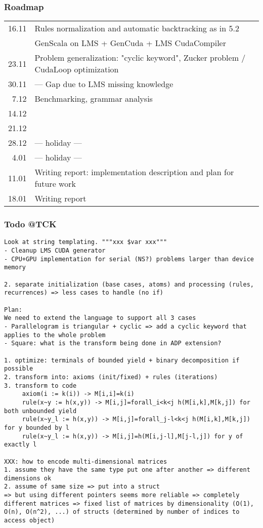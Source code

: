 \documentclass[11pt]{article}
\begin{document}
\subsubsection*{Roadmap}
\begin{tabular}{rl}
16.11 & Rules normalization and automatic backtracking as in 5.2 \\
	& GenScala on LMS + GenCuda + LMS CudaCompiler \\
23.11 & Problem generalization: "cyclic keyword", Zucker problem / CudaLoop optimization \\
30.11 &--- Gap due to LMS missing knowledge \\
7.12 & Benchmarking, grammar analysis \\
14.12 & \\
21.12 & \\
28.12 & --- holiday --- \\
 4.01 & --- holiday --- \\
11.01 & Writing report: implementation description and plan for future work \\
18.01 & Writing report
\end{tabular}

\subsubsection*{Todo @TCK}
\begin{verbatim}
Look at string templating. """xxx $var xxx"""
- Cleanup LMS CUDA generator
- CPU+GPU implementation for serial (NS?) problems larger than device memory

2. separate initialization (base cases, atoms) and processing (rules, recurrences) => less cases to handle (no if)

Plan:
We need to extend the language to support all 3 cases
- Parallelogram is triangular + cyclic => add a cyclic keyword that applies to the whole problem
- Square: what is the transform being done in ADP extension?

1. optimize: terminals of bounded yield + binary decomposition if possible
2. transform into: axioms (init/fixed) + rules (iterations)
3. transform to code
     axiom(i := k(i)) -> M[i,i]=k(i)
     rule(x~y := h(x,y)) -> M[i,j]=forall_i<k<j h(M[i,k],M[k,j]) for both unbounded yield
     rule(x~y_l := h(x,y)) -> M[i,j]=forall_j-l<k<j h(M[i,k],M[k,j]) for y bounded by l
     rule(x~y_l := h(x,y)) -> M[i,j]=h(M[i,j-l],M[j-l,j]) for y of exactly l

XXX: how to encode multi-dimensional matrices
1. assume they have the same type put one after another => different dimensions ok
2. assume of same size => put into a struct
=> but using different pointers seems more reliable => completely different matrices => fixed list of matrices by dimensionality (O(1), O(n), O(n^2), ...) of structs (determined by number of indices to access object)
\end{verbatim}
\end{document}
